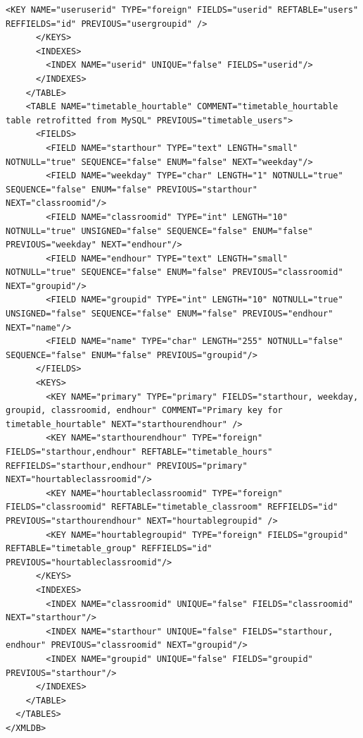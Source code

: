 \documentclass[a4paper]{report}  %
\begin{document}
\begin{lstlisting}[style=XML,caption=Fitxer xmldb install.xml per la creació de les taules]
		<KEY NAME="useruserid" TYPE="foreign" FIELDS="userid" REFTABLE="users" REFFIELDS="id" PREVIOUS="usergroupid" />
      </KEYS>
      <INDEXES>
        <INDEX NAME="userid" UNIQUE="false" FIELDS="userid"/>
      </INDEXES>
    </TABLE>
    <TABLE NAME="timetable_hourtable" COMMENT="timetable_hourtable table retrofitted from MySQL" PREVIOUS="timetable_users">
      <FIELDS>
        <FIELD NAME="starthour" TYPE="text" LENGTH="small" NOTNULL="true" SEQUENCE="false" ENUM="false" NEXT="weekday"/>
        <FIELD NAME="weekday" TYPE="char" LENGTH="1" NOTNULL="true" SEQUENCE="false" ENUM="false" PREVIOUS="starthour" NEXT="classroomid"/>
        <FIELD NAME="classroomid" TYPE="int" LENGTH="10" NOTNULL="true" UNSIGNED="false" SEQUENCE="false" ENUM="false" PREVIOUS="weekday" NEXT="endhour"/>
        <FIELD NAME="endhour" TYPE="text" LENGTH="small" NOTNULL="true" SEQUENCE="false" ENUM="false" PREVIOUS="classroomid" NEXT="groupid"/>
        <FIELD NAME="groupid" TYPE="int" LENGTH="10" NOTNULL="true" UNSIGNED="false" SEQUENCE="false" ENUM="false" PREVIOUS="endhour" NEXT="name"/>
        <FIELD NAME="name" TYPE="char" LENGTH="255" NOTNULL="false" SEQUENCE="false" ENUM="false" PREVIOUS="groupid"/>
      </FIELDS>
      <KEYS>
        <KEY NAME="primary" TYPE="primary" FIELDS="starthour, weekday, groupid, classroomid, endhour" COMMENT="Primary key for timetable_hourtable" NEXT="starthourendhour" />
		<KEY NAME="starthourendhour" TYPE="foreign" FIELDS="starthour,endhour" REFTABLE="timetable_hours" REFFIELDS="starthour,endhour" PREVIOUS="primary" NEXT="hourtableclassroomid"/>
		<KEY NAME="hourtableclassroomid" TYPE="foreign" FIELDS="classroomid" REFTABLE="timetable_classroom" REFFIELDS="id" PREVIOUS="starthourendhour" NEXT="hourtablegroupid" />
		<KEY NAME="hourtablegroupid" TYPE="foreign" FIELDS="groupid" REFTABLE="timetable_group" REFFIELDS="id" PREVIOUS="hourtableclassroomid"/>
      </KEYS>
      <INDEXES>
        <INDEX NAME="classroomid" UNIQUE="false" FIELDS="classroomid" NEXT="starthour"/>
        <INDEX NAME="starthour" UNIQUE="false" FIELDS="starthour, endhour" PREVIOUS="classroomid" NEXT="groupid"/>
        <INDEX NAME="groupid" UNIQUE="false" FIELDS="groupid" PREVIOUS="starthour"/>
      </INDEXES>
    </TABLE>
  </TABLES>
</XMLDB>

\end{lstlisting}
\end{document}

